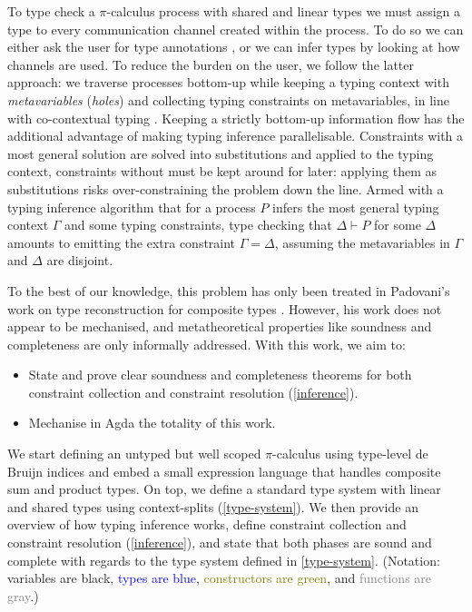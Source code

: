 \documentclass[sigplan,screen,review]{acmart}
\theoremstyle{definition}\newtheorem{mytheorem}{Theorem}[section]
\newcommand{\picalc}{$\pi$-calculus}
\begin{document}
To type check a \picalc{} process with shared and linear types we must assign a type to every communication channel created within the process.
To do so we can either ask the user for type annotations \cite{ZalakainD21}, or we can infer types by looking at how channels are used.
To reduce the burden on the user, we follow the latter approach: we traverse processes bottom-up while keeping a typing context with \emph{metavariables} (\emph{holes}) and collecting typing constraints on metavariables, in line with co-contextual typing \cite{ErdwegBKKM15}.
Keeping a strictly bottom-up information flow has the additional advantage of making typing inference parallelisable.
Constraints with a most general solution are solved into substitutions and applied to the typing context, constraints without must be kept around for later: applying them as substitutions risks over-constraining the problem down the line.
Armed with a typing inference algorithm that for a process $P$ infers the most general typing context $\Gamma$ and some typing constraints, type checking that $\Delta \vdash P$ for some $\Delta$ amounts to emitting the extra constraint $\Gamma = \Delta$, assuming the metavariables in $\Gamma$ and $\Delta$ are disjoint.

To the best of our knowledge, this problem has only been treated in Padovani's work on type reconstruction for composite types \cite{Padovani15}.
However, his work does not appear to be mechanised, and metatheoretical properties like soundness and completeness are only informally addressed.
With this work, we aim to:
\begin{itemize}
  \item State and prove clear soundness and completeness theorems for both constraint collection and constraint resolution (\autoref{inference}).
  \item Mechanise in Agda the totality of this work.
\end{itemize}

We start defining an untyped but well scoped \picalc{} using type-level de Bruijn indices \cite{deBruijn72} and embed a small expression language that handles composite sum and product types.
On top, we define a standard type system with linear and shared types using context-splits (\autoref{type-system}).
We then provide an overview of how typing inference works, define constraint collection and constraint resolution (\autoref{inference}), and state that both phases are sound and complete with regards to the type system defined in \autoref{type-system}.
(Notation: variables are black, \textcolor{blue}{types are blue}, \textcolor{olive}{constructors are green}, and \textcolor{gray}{functions are gray}.)
\end{document}
